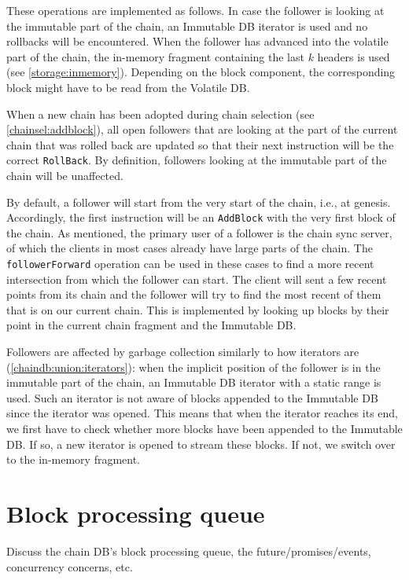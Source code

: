 These operations are implemented as follows. In case the follower is looking at
the immutable part of the chain, an Immutable DB iterator is used and no
rollbacks will be encountered. When the follower has advanced into the volatile
part of the chain, the in-memory fragment containing the last $k$ headers is
used (see \cref{storage:inmemory}). Depending on the block component, the
corresponding block might have to be read from the Volatile DB.

When a new chain has been adopted during chain selection (see
\cref{chainsel:addblock}), all open followers that are looking at the part of
the current chain that was rolled back are updated so that their next
instruction will be the correct \lstinline!RollBack!. By definition, followers
looking at the immutable part of the chain will be unaffected.

By default, a follower will start from the very start of the chain, i.e., at
genesis. Accordingly, the first instruction will be an \lstinline!AddBlock! with
the very first block of the chain. As mentioned, the primary user of a follower
is the chain sync server, of which the clients in most cases already have large
parts of the chain. The \lstinline!followerForward! operation can be used in
these cases to find a more recent intersection from which the follower can
start. The client will sent a few recent points from its chain and the follower
will try to find the most recent of them that is on our current chain. This is
implemented by looking up blocks by their point in the current chain fragment
and the Immutable DB.

Followers are affected by garbage collection similarly to how iterators are
(\cref{chaindb:union:iterators}): when the implicit position of the follower is
in the immutable part of the chain, an Immutable DB iterator with a static range
is used. Such an iterator is not aware of blocks appended to the Immutable DB
since the iterator was opened. This means that when the iterator reaches its
end, we first have to check whether more blocks have been appended to the
Immutable DB. If so, a new iterator is opened to stream these blocks. If not, we
switch over to the in-memory fragment.

\section{Block processing queue}
\label{chaindb:queue}

Discuss the chain DB's block processing queue, the future/promises/events,
concurrency concerns, etc.


